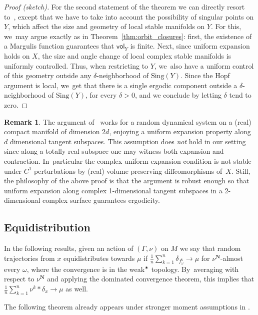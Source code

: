 \documentclass[JEP,XML,SOM,Unicode,published]{cedram}
\newcommand{\unsur}[1]{\frac{1}{#1}}
\def\N{\mathbf{N}}
\newcommand{\vol}{{\mathsf{vol}}}
\theoremstyle{plain}
\theoremstyle{definition}
\newtheorem{rem}[thm]{Remark}
\begin{document}
\begin{proof}[Proof (sketch)]
For the second statement of the theorem we can directly resort to~\cite{liu_thesis, chung}, except that
we have to take into account the possibility of singular points on $Y$, which affect the size and geometry of local stable manifolds on $Y$. For this, we~may argue exactly as in Theorem~\ref{thm:orbit_closures}:
first, the existence of a Margulis function guarantees that $\vol_Y$ is finite. Next, since
uniform expansion holds on $X$, the size and angle change of local complex stable manifolds is uniformly controlled. Thus, when restricting to $Y$, we~also have a uniform control of this geometry outside any
$\delta$-neighborhood of $\mathrm{Sing}(Y)$. Since the Hopf argument is local, we~get that there is a single
ergodic component outside a $\delta$-neighborhood of $\mathrm{Sing}(Y)$, for every $\delta>0$, and we conclude by letting $\delta$ tend to zero.
\end{proof}

\begin{rem}
The argument of~\cite{dolgopyat-krikorian} works for a random dynamical system on a (real) compact
manifold of dimension $2d$, enjoying a uniform expansion property
along $d$ dimensional tangent subspaces. This assumption
does \emph{not} hold in our setting since along a totally real subspace one
may witness both expansion and
contraction. In~particular the complex uniform expansion condition is not stable under
$C^1$ perturbations by (real) volume preserving diffeomorphisms of~$X$.
Still, the philosophy of the above proof is that
the argument is robust enough so that uniform expansion along complex 1-dimensional
tangent subspaces in a 2-dimensional complex surface guarantees ergodicity.
\end{rem}

\subsection{Equidistribution}

In the following results, given an action of $(\Gamma, \nu)$ on $M$
we say
that random trajectories from $x$ equidistributes towards
$\mu$ if
$\unsur{n}\sum_{k=1}^n \delta_{f^k_\omega} \to \mu$ for $\nu^\N$-almost every
$\omega$, where the convergence is in the
weak$^\varstar$ topology. By~averaging with respect to $\nu^\N$ and applying
the dominated convergence theorem, this implies that
$\unsur{n}\sum_{k=1}^n \nu^k\ast\delta_x\to\mu$ as well.

The following theorem already appears under stronger moment assumptions in \cite[Th.\,D]{chung}.
\end{document}

